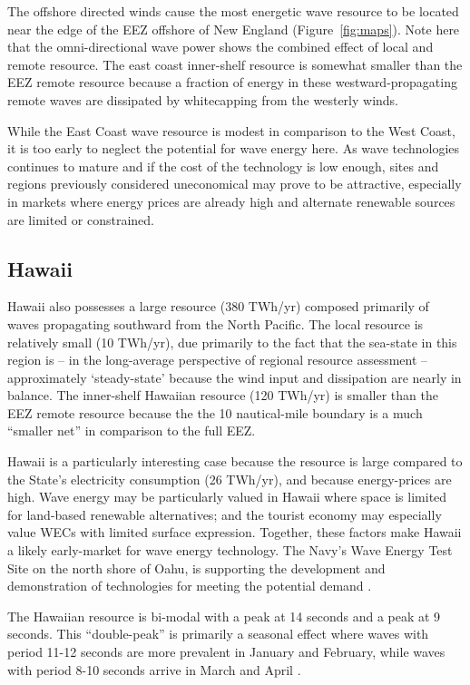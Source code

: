 The offshore directed winds cause the most energetic wave resource to be located near the edge of the EEZ offshore of New England (Figure~\ref{fig:maps}). Note here that the omni-directional wave power shows the combined effect of local and remote resource. The east coast inner-shelf resource is somewhat smaller than the EEZ remote resource because a fraction of energy in these westward-propagating remote waves are dissipated by whitecapping from the westerly winds.

While the East Coast wave resource is modest in comparison to the West Coast, it is too early to neglect the potential for wave energy here. As wave technologies continues to mature and if the cost of the technology is low enough, sites and regions previously considered uneconomical may prove to be attractive, especially in markets where energy prices are already high and alternate renewable sources are limited or constrained. 

\subsection{Hawaii}

Hawaii also possesses a large resource (380 TWh/yr) composed primarily of waves propagating southward from the North Pacific. The local resource is relatively small (10 TWh/yr), due primarily to the fact that the sea-state in this region is -- in the long-average perspective of regional resource assessment -- approximately `steady-state' because the wind input and dissipation are nearly in balance. The inner-shelf Hawaiian resource (120 TWh/yr) is smaller than the EEZ remote resource because the the 10 nautical-mile boundary is a much ``smaller net'' in comparison to the full EEZ.

Hawaii is a particularly interesting case because the resource is large compared to the State's electricity consumption (26 TWh/yr), and because energy-prices are high. Wave energy may be particularly valued in Hawaii where space is limited for land-based renewable alternatives; and the tourist economy may especially value WECs with limited surface expression. Together, these factors make Hawaii a likely early-market for wave energy technology. The Navy's Wave Energy Test Site on the north shore of Oahu, is supporting the development and demonstration of technologies for meeting the potential demand \citep{crossEarlyResearchEfforts2015}.

The Hawaiian resource is bi-modal with a peak at 14 seconds and a peak at 9 seconds. This ``double-peak'' is primarily a seasonal effect where waves with period 11-12 seconds are more prevalent in January and February, while waves with period 8-10 seconds arrive in March and April \citep[][]{stopa2013wave}. 

